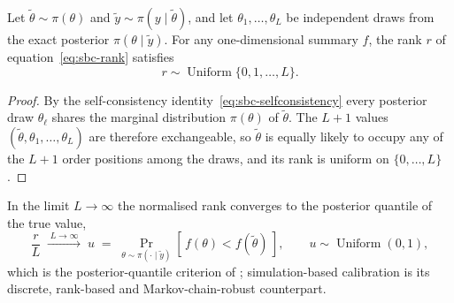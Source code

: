 \begin{theorem}
\label{thm:sbc}
Let $\tilde\theta\sim\pi(\theta)$ and $\tilde y\sim\pi(y\mid\tilde\theta)$, and let
$\theta_1,\dots,\theta_L$ be independent draws from the exact posterior
$\pi(\theta\mid\tilde y)$. For any one-dimensional summary $f$, the rank $r$ of
equation~\eqref{eq:sbc-rank} satisfies
\begin{equation}
  r \sim \operatorname{Uniform}\{0,1,\dots,L\}.
  \label{eq:sbc-uniform}
\end{equation}
\end{theorem}

\begin{proof}
By the self-consistency identity~\eqref{eq:sbc-selfconsistency} every posterior draw
$\theta_\ell$ shares the marginal distribution $\pi(\theta)$ of $\tilde\theta$. The
$L+1$ values $(\tilde\theta,\theta_1,\dots,\theta_L)$ are therefore exchangeable, so
$\tilde\theta$ is equally likely to occupy any of the $L+1$ order positions among the
draws, and its rank is uniform on $\{0,\dots,L\}$.
\end{proof}

In the limit $L\to\infty$ the normalised rank converges to the
posterior quantile of the true value,
%
\begin{equation}
  \frac{r}{L} \;\xrightarrow{\;L\to\infty\;}\;
  u \;=\; \Pr_{\theta\sim\pi(\cdot\mid\tilde y)}\!\left[\, f(\theta) < f(\tilde\theta) \,\right],
  \qquad u \sim \operatorname{Uniform}(0,1),
  \label{eq:sbc-pit}
\end{equation}
%
which is the posterior-quantile criterion of
\textcite{cook2006validation}; simulation-based calibration is its discrete,
rank-based and Markov-chain-robust counterpart.

